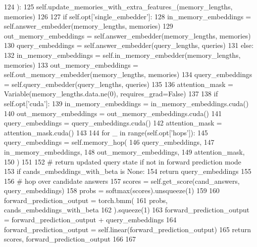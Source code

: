 \begin{DoxyCode}
124     ):
125         self.update\_memories\_with\_extra\_features\_(memory\_lengths, memories)
126 
127         \textcolor{keywordflow}{if} self.opt[\textcolor{stringliteral}{'single\_embedder'}]:
128             in\_memory\_embeddings = self.answer\_embedder(memory\_lengths, memories)
129             out\_memory\_embeddings = self.answer\_embedder(memory\_lengths, memories)
130             query\_embeddings = self.answer\_embedder(query\_lengths, queries)
131         \textcolor{keywordflow}{else}:
132             in\_memory\_embeddings = self.in\_memory\_embedder(memory\_lengths, memories)
133             out\_memory\_embeddings = self.out\_memory\_embedder(memory\_lengths, memories)
134             query\_embeddings = self.query\_embedder(query\_lengths, queries)
135 
136         attention\_mask = Variable(memory\_lengths.data.ne(0), requires\_grad=\textcolor{keyword}{False})
137 
138         \textcolor{keywordflow}{if} self.opt[\textcolor{stringliteral}{'cuda'}]:
139             in\_memory\_embeddings = in\_memory\_embeddings.cuda()
140             out\_memory\_embeddings = out\_memory\_embeddings.cuda()
141             query\_embeddings = query\_embeddings.cuda()
142             attention\_mask = attention\_mask.cuda()
143 
144         \textcolor{keywordflow}{for} \_ \textcolor{keywordflow}{in} range(self.opt[\textcolor{stringliteral}{'hops'}]):
145             query\_embeddings = self.memory\_hop(
146                 query\_embeddings,
147                 in\_memory\_embeddings,
148                 out\_memory\_embeddings,
149                 attention\_mask,
150             )
151 
152         \textcolor{comment}{# return updated query state if not in forward prediction mode}
153         \textcolor{keywordflow}{if} cands\_embeddings\_with\_beta \textcolor{keywordflow}{is} \textcolor{keywordtype}{None}:
154             \textcolor{keywordflow}{return} query\_embeddings
155 
156         \textcolor{comment}{# hop over candidate answers}
157         scores = self.get\_score(cand\_answers, query\_embeddings)
158         probs = softmax(scores).unsqueeze(1)
159 
160         forward\_prediction\_output = torch.bmm(
161             probs, cands\_embeddings\_with\_beta
162         ).squeeze(1)
163         forward\_prediction\_output = forward\_prediction\_output + query\_embeddings
164         forward\_prediction\_output = self.linear(forward\_prediction\_output)
165         \textcolor{keywordflow}{return} scores, forward\_prediction\_output
166 
167 
\end{DoxyCode}
\mbox{\label{classprojects_1_1memnn__feedback_1_1agent_1_1modules_1_1MemNN_abdfd4ea1cd5d9eada46e5f091d026d59}} 
